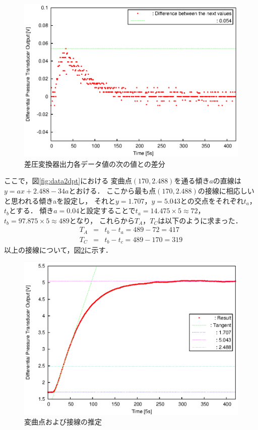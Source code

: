 \documentclass[11pt,a4paper]{jsarticle}
\begin{document}
    \begin{figure}[b]
      \begin{center}
        \includegraphics[width=0.9\hsize]{./fig/data2diff.eps}
      \end{center}
      \caption{差圧変換器出力各データ値の次の値との差分}
      \label{fig:data2diff}
    \end{figure}

    ここで，図\ref{fig:data2dpt}における
    変曲点$(170,2.488)$を通る傾き$a$の直線は$y = a x + 2.488 -34a$とおける．
    ここから最も点$(170,2.488)$の接線に相応しいと思われる傾きaを設定し，
    それと$y = 1.707$，$y = 5.043$との交点をそれぞれ$t_a$，$t_b$とする．
    傾き$a = 0.04$と設定することで$t_a = 14.475 \times 5 \approx 72$，
    $t_b = 97.875 \times 5 \approx 489$となり，
    これらから$T_A$，$T_C$は以下のように求まった．
    \begin{eqnarray}
      T_A &=& t_b - t_a = 489 - 72 = 417 \\
      T_C &=& t_b - t_c = 489 - 170 = 319
    \end{eqnarray}
    以上の接線について，図\ref{fig:data2lines}に示す．\\
    
    \begin{figure}[b]
      \begin{center}
        \includegraphics[width=0.9\hsize]{./fig/data2lines.eps}
      \end{center}
      \caption{変曲点および接線の推定}
      \label{fig:data2lines}
    \end{figure}
    
\end{document}

